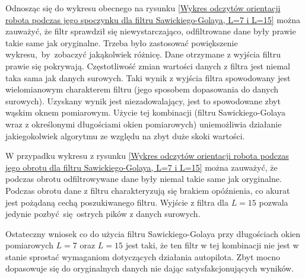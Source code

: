 {{{        

        Odnosząc się do wykresu obecnego na rysunku \ref{Wykres odczytów orientacji robota podczas jego spoczynku dla filtru Sawickiego-Golaya, L=7 i L=15} można zauważyć, że filtr sprawdził się niewystarczająco, odfiltrowane dane były prawie takie same jak oryginalne. Trzeba było zastosować powiększenie wykresu,~by~zobaczyć jakąkolwiek różnicę.
        Dane otrzymane z wyjścia filtru prawie się pokrywają. Częstotliwość zmian wartości danych z filtra jest niemal taka sama jak danych surowych. Taki wynik z wyjścia filtra spowodowany jest wielomianowym charakterem filtru (jego sposobem dopasowania do danych surowych). Uzyskany wynik jest niezadowalający, jest to spowodowane zbyt wąskim oknem pomiarowym. Użycie tej kombinacji (filtru Sawickiego-Golaya wraz z określonymi długościami okien pomiarowych) uniemożliwia działanie jakiegokolwiek algorytmu ze względu na zbyt duże skoki wartości.

        \newpage
        
         W przypadku wykresu z rysunku \ref{Wykres odczytów orientacji robota podczas jego obrotu dla filtru Sawickiego-Golaya,
        L=7 i L=15} można zauważyć, że podczas obrotu odfiltrowywane dane były niemal takie same jak oryginalne. Podczas obrotu dane z filtru charakteryzują się brakiem opóźnienia, co akurat jest pożądaną cechą poszukiwanego filtru. Wyjście z filtra dla $L=15$ pozwala jedynie pozbyć się ostrych pików z danych surowych.

         Ostateczny wniosek co do użycia filtru Sawickiego-Golaya przy długościach okien pomiarowych $L=7$ oraz $L=15$ jest taki, że ten filtr w tej kombinacji nie jest w stanie sprostać wymaganiom dotyczących działania autopilota. Zbyt mocno dopasowuje się do oryginalnych danych nie dając satysfakcjonujących wyników.

        
        \newpage

        
}}}
